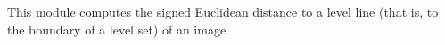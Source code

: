 This module computes the signed Euclidean distance to a level line 
(that is, to the boundary of a level set) of an image. 
